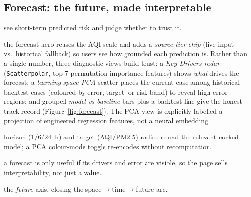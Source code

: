 \documentclass[a4paper]{article}
\newenvironment{designnotes}
  {\begin{description}[leftmargin=0pt, itemsep=2pt, parsep=1pt, topsep=3pt, style=unboxed, font=\normalfont\bfseries]}
  {\end{description}}
\begin{document}

\subsection{Forecast: the future, made interpretable}
\begin{designnotes}
\item[User goal:] see short-term predicted risk and judge whether to trust it.
\item[Encodings \& rationale:] the forecast hero reuses the AQI scale and adds a \emph{source-tier chip}
(live input vs.\ historical fallback) so users see how grounded each prediction is. Rather than a single
number, three diagnostic views build trust: a \emph{Key-Drivers radar} (\texttt{Scatterpolar}, top-7
permutation-importance features) shows \emph{what} drives the forecast; a \emph{learning-space PCA}
scatter places the current case among historical backtest cases (coloured by error, target, or risk band)
to reveal high-error regions; and grouped \emph{model-vs-baseline} bars plus a backtest line give the
honest track record (Figure~\ref{fig:forecast}). The PCA view is explicitly labelled a projection of
engineered regression features, not a neural embedding.
\item[Interaction:] horizon (1/6/24~h) and target (AQI/PM2.5) radios reload the relevant cached model;
a PCA colour-mode toggle re-encodes without recomputation.
\item[Key insight:] a forecast is only useful if its drivers and error are visible, so the page sells
interpretability, not just a value.
\item[Narrative link:] the \emph{future} axis, closing the space$\rightarrow$time$\rightarrow$future arc.
\end{designnotes}
\end{document}
